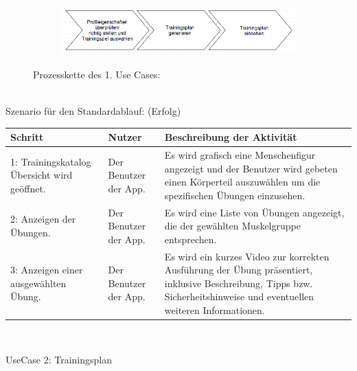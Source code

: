 \documentclass[FIPLY_base.tex]{subfiles}
\begin{document}
	\begin{figure}[H]

		\begin{subfigure}[b]{0.3\textwidth}
			\centering
			\includegraphics[scale=0.65]{img/TrainingsplanGenerierenLassen}
		\end{subfigure}
		\caption{Prozesskette des 1. Use Cases:}
	\end{figure}
		\ \\
	Szenario für den Standardablauf: (Erfolg)
		\ \\
	\begin{center}	
		\def\arraystretch{1.3}%
		\begin{tabular}{| p{4cm} |  p{4cm} |  p{4cm} |}
			\hline
			\textbf{Schritt} & \textbf{Nutzer} & \textbf{Beschreibung der Aktivität}
			\\ \hline 
			1: Trainingskatalog Übersicht wird geöffnet. & Der Benutzer der App. & Es wird grafisch eine Menschenfigur angezeigt und der Benutzer wird gebeten einen Körperteil auszuwählen um die spezifischen Übungen einzusehen.
			\\ \hline
			2: Anzeigen der Übungen. & Der Benutzer der App. & Es wird eine Liste von Übungen angezeigt, die der gewählten Muskelgruppe entsprechen. 
			\\ \hline
			3: Anzeigen einer ausgewählten Übung. & Der Benutzer der App. & Es wird ein kurzes Video zur korrekten Ausführung der Übung präsentiert, inklusive Beschreibung, Tipps bzw. Sicherheitshinweise und eventuellen weiteren Informationen.
			\\ \hline
		\end{tabular} \\
	\end{center}
		\newpage
	UseCase 2: Trainingsplan
		\ \\
\end{document}
